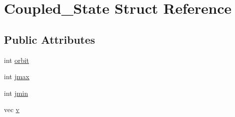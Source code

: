 \hypertarget{struct_coupled___state}{\section{Coupled\-\_\-\-State Struct Reference}
\label{struct_coupled___state}
}
\subsection*{Public Attributes}
\begin{DoxyCompactItemize}
\item 
int \hyperlink{struct_coupled___state_a7f995cca6b0a5bb41e30d9723e358887}{orbit}
\item 
int \hyperlink{struct_coupled___state_a923e8978be136d1c09742c608914a00b}{jmax}
\item 
int \hyperlink{struct_coupled___state_a473ea496bd301f167432a8e61d6487bc}{jmin}
\item 
vec \hyperlink{struct_coupled___state_a0cf310a6235dd6ff6d140b94717ca735}{v}
\end{DoxyCompactItemize}


